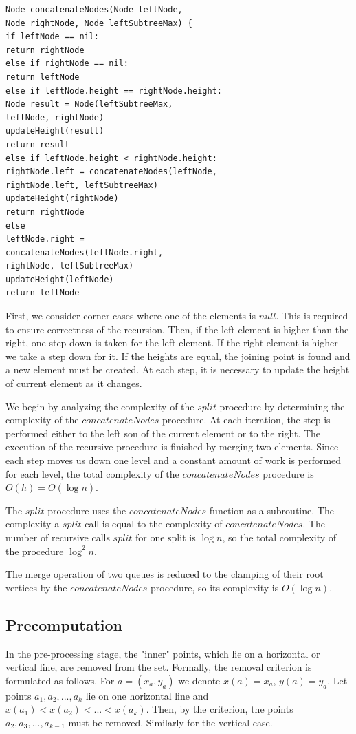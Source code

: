 \documentclass[conference]{IEEEtran}
\theoremstyle{plane}
\begin{document}
\begin{lstlisting}[caption={Merging two queues using heights},captionpos=b]
Node concatenateNodes(Node leftNode, 
Node rightNode, Node leftSubtreeMax) {
if leftNode == nil:
return rightNode
else if rightNode == nil: 
return leftNode
else if leftNode.height == rightNode.height:
Node result = Node(leftSubtreeMax, 
leftNode, rightNode)
updateHeight(result)
return result
else if leftNode.height < rightNode.height:
rightNode.left = concatenateNodes(leftNode, 
rightNode.left, leftSubtreeMax)
updateHeight(rightNode)
return rightNode
else
leftNode.right = 
concatenateNodes(leftNode.right, 
rightNode, leftSubtreeMax)
updateHeight(leftNode)
return leftNode
\end{lstlisting}

First, we consider corner cases where one of the elements is $null$. This is required to ensure correctness of the recursion. Then, if the left element is higher than the right, one step down is taken for the left element. If the right element is higher - we take a step down for it. If the heights are equal, the joining point is found and a new element must be created. At each step, it is necessary to update the height of current element as it changes.

We begin by analyzing the complexity of the $split$ procedure by determining the complexity of the $concatenateNodes$ procedure. At each iteration, the step is performed either to the left son of the current element or to the right. The execution of the recursive procedure is finished by merging two elements. Since each step moves us down one level and a constant amount of work is performed for each level, the total complexity of the $concatenateNodes$ procedure is $O(h)=O(\log n)$.

The $split$ procedure uses the $concatenateNodes$ function as a subroutine. The complexity a $split$ call is equal to the complexity of $concatenateNodes$. The number of recursive calls $split$ for one split is $\log n$, so the total complexity of the procedure $\log^2 n$.

The merge operation of two queues is reduced to the clamping of their root vertices by the $concatenateNodes$ procedure, so its complexity is $O(\log n)$.

\subsection{Precomputation}

In the pre-processing stage, the "inner" points, which lie on a horizontal or vertical line, are removed from the set. Formally, the removal criterion is formulated as follows. For $a = (x_a, y_a)$ we denote $x(a)=x_a$, $y(a)=y_a$. Let points $a_1, a_2, ..., a_k$ lie on one horizontal line and $x(a_1) < x(a_2) <... <x (a_k) $. Then, by the criterion, the points $a_2, a_3, ..., a_{k-1}$ must be removed. Similarly for the vertical case.
\end{document}
